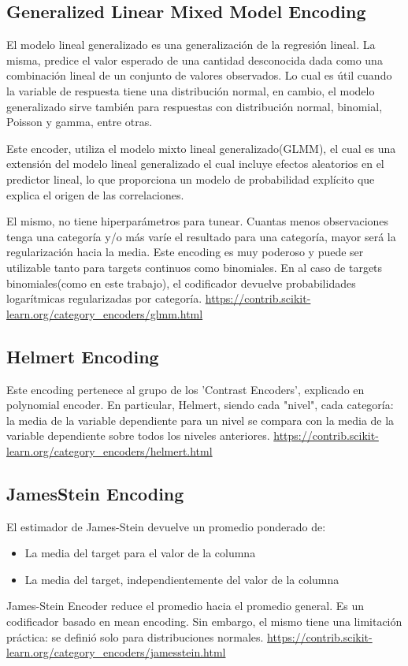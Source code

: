 \documentclass[12pt,a4paper]{article}
\begin{document}
\subsection{Generalized Linear Mixed Model Encoding}

El modelo lineal generalizado es una generalización de la regresión lineal. La misma, predice el valor esperado de una cantidad desconocida dada como una combinación lineal de un conjunto de valores observados. Lo cual es útil cuando la variable de respuesta tiene una distribución normal, en cambio, el modelo generalizado sirve también para respuestas con distribución normal, binomial, Poisson y gamma, entre otras. \newline

Este encoder, utiliza el modelo mixto lineal generalizado(GLMM), el cual es una extensión del modelo lineal generalizado el cual incluye efectos aleatorios en el predictor lineal, lo que proporciona un modelo de probabilidad explícito que explica el origen de las correlaciones.\newline

El mismo, no tiene hiperparámetros para tunear. Cuantas menos observaciones tenga una categoría y/o más varíe el resultado para una categoría, mayor será la regularización hacia la media. Este encoding es muy poderoso y puede ser utilizable tanto para targets continuos como binomiales. En al caso de targets binomiales(como en este trabajo), el codificador devuelve probabilidades logarítmicas regularizadas por categoría.
\url{https://contrib.scikit-learn.org/category_encoders/glmm.html}

\subsection{Helmert Encoding}

Este encoding pertenece al grupo de los 'Contrast Encoders', explicado en polynomial encoder.
En particular, Helmert, siendo cada "nivel", cada categoría: la media de la variable dependiente para un nivel se compara con la media de la variable dependiente sobre todos los niveles anteriores.
\url{https://contrib.scikit-learn.org/category_encoders/helmert.html}

\subsection{JamesStein Encoding}
El estimador de James-Stein devuelve un promedio ponderado de:
\begin{itemize}
    \item La media del target para el valor de la columna 
    \item La media del target, independientemente del valor de la columna
\end{itemize}
James-Stein Encoder reduce el promedio hacia el promedio general. Es un codificador basado en mean encoding. Sin embargo, el mismo tiene una limitación práctica: se definió solo para distribuciones normales.
\url{https://contrib.scikit-learn.org/category_encoders/jamesstein.html}
\end{document}
